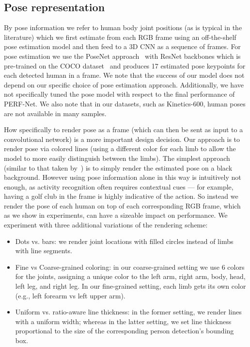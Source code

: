\documentclass[letterpaper]{article} \usepackage{aaai21}  \usepackage{times}  \usepackage{helvet} \usepackage{courier}  \usepackage[hyphens]{url}  \usepackage{graphicx} \urlstyle{rm} \def\UrlFont{\rm}  \usepackage{natbib}  \usepackage{caption} \frenchspacing  \setlength{\pdfpagewidth}{8.5in}  \setlength{\pdfpageheight}{11in}
\begin{document}
\subsection{Pose representation}
\label{sec:data_rendering}



By pose information we refer to human body joint positions (as is typical in the literature) which we first estimate from each RGB frame using an off-the-shelf pose estimation model and then feed to a 3D CNN as a sequence of frames. For pose estimation we use the PoseNet approach~\cite{posenet2015,posenet_inwild} with ResNet backbones which is pre-trained on the COCO dataset~\cite{lin2014microsoft} and produces 17 estimated pose keypoints for each detected human in a frame.  We note that the success of our model does not depend on our specific choice of pose estimation approach. Additionally, we have not specifically tuned the pose model with respect to the final performance of PERF-Net. We also note that in our datasets, such as Kinetics-600, human poses are not available in many samples.

How specifically to render pose as a frame (which can then be sent as input to a convolutional network) is a more important design decision.  Our approach is to render pose via colored lines (using a different color for each limb to allow the model to more easily distinguish between the limbs). The simplest approach (similar to that taken by~\citealt{zolfaghari2017chained}) is to simply render the estimated pose on a black background.  However using pose information
alone in this way is intuitively not enough, as activity recognition often  requires  contextual  cues --- for example, having a golf club in the frame is highly indicative of the action. So instead we render the pose of each human on top of each corresponding RGB frame, which as we show in experiments, can have a sizeable impact on performance. We experiment with three additional variations of the rendering scheme:
\begin{itemize}
\item Dots vs. bars: we render joint locations with filled circles instead of limbs with line segments.
    \item Fine vs Coarse-grained coloring: in our coarse-grained setting we use 6 colors for the joints, assigning a unique color to the left arm, right arm, body, head, left leg, and right leg.  In our fine-grained setting, each limb gets its own color (e.g., left forearm vs left upper arm).
\item Uniform vs. ratio-aware line thickness: in the former setting, we render lines with a uniform width; whereas in the latter setting,
we set line thickness proportional to the size of the corresponding
person detection's bounding box.
\end{itemize}
\end{document}
